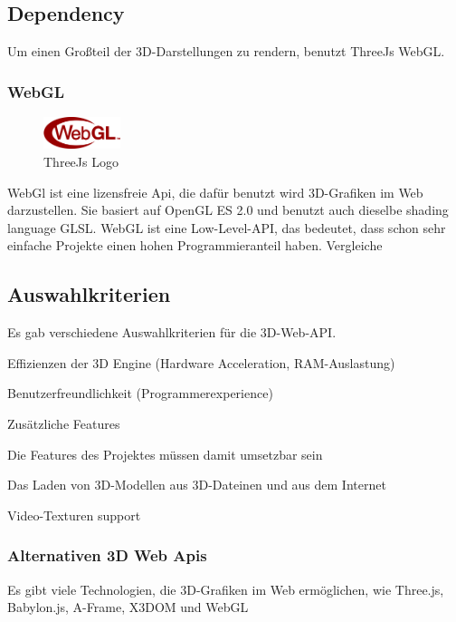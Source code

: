\subsection{Dependency}
\label{ch::ThreeJsDependency}
Um einen Großteil der 3D-Darstellungen zu rendern, benutzt ThreeJs WebGL.

\subsubsection{WebGL}
\label{ch::webgl}
\begin{figure}
    \begin{center}
      \includegraphics[width=0.2\textwidth]{pics/WebGL_Logo.png}
     \caption{ThreeJs Logo}
    \end{center}
\end{figure}
WebGl ist eine lizensfreie Api, die dafür benutzt wird 3D-Grafiken im Web darzustellen. Sie basiert auf OpenGL ES 2.0 und benutzt auch dieselbe shading language GLSL. WebGL ist eine Low-Level-API, das bedeutet, dass schon sehr einfache Projekte einen hohen Programmieranteil haben. Vergleiche\cite[WebGl Getting Started]{WebglGettingStarted}


\subsection{Auswahlkriterien}
Es gab verschiedene Auswahlkriterien für die 3D-Web-API.
\begin{compactitem}
  \item Effizienzen der 3D Engine (Hardware Acceleration, RAM-Auslastung)
  \item Benutzerfreundlichkeit (Programmerexperience)
  \item Zusätzliche Features
  \item Die Features des Projektes müssen damit umsetzbar sein
  \begin{compactenum}
    \item Das Laden von 3D-Modellen aus 3D-Dateinen und aus dem Internet
    \item Video-Texturen support
  \end{compactenum}
\end{compactitem}

\subsubsection{Alternativen 3D Web Apis}
Es gibt viele Technologien, die 3D-Grafiken im Web ermöglichen, wie Three.js, Babylon.js, A-Frame, X3DOM und WebGL

